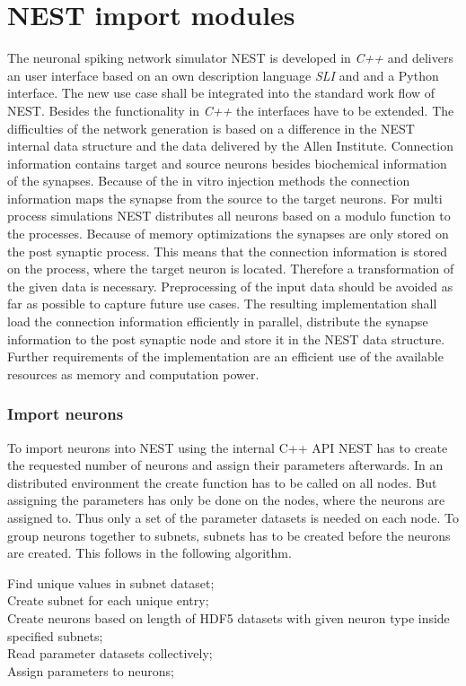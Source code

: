 \section{NEST import modules}
The neuronal spiking network simulator NEST is developed in \emph{C++} and delivers
an user interface based on an own description language \emph{SLI} and  and a Python interface.
The new use case shall be integrated into the standard work flow of NEST.
Besides the functionality in \emph{C++} the interfaces have to be extended.
The difficulties of the network generation is based on a difference in 
the NEST internal data structure and the data delivered by the Allen Institute.
Connection information contains target and source neurons besides biochemical
information of the synapses. Because of the in vitro injection methods the
connection information maps the synapse from the source to the target neurons.
For multi process simulations NEST distributes all neurons based on a modulo function 
to the processes. Because of memory optimizations the synapses are only stored on the
post synaptic process. This means that the connection information is stored
on the process, where the target neuron is located. Therefore a transformation of the given data is
necessary. Preprocessing of the input data should be avoided as far as possible to capture
future use cases.
The resulting implementation shall load the connection information efficiently in parallel,
distribute the synapse information to the post synaptic node and store it in
the NEST data structure.
Further requirements of the implementation are an efficient use of the available resources as
memory and computation power. 


\subsubsection{Import neurons}
To import neurons into NEST using the internal C++ API NEST has to create the requested number of neurons and
assign their parameters afterwards. In an distributed environment the create function has to be called on all nodes. But assigning the parameters has only be done on the nodes, where the neurons are assigned to.
Thus only a set of the parameter datasets is needed on each node.
To group neurons together to subnets, subnets has to be created before the neurons are created.
This follows in the following algorithm.

\begin{algorithm}
 Find unique values in subnet dataset; \\
 Create subnet for each unique entry; \\
 Create neurons based on length of HDF5 datasets with given neuron type inside specified subnets; \\
 Read parameter datasets collectively; \\
 Assign parameters to neurons;
\label{alg2}
\caption{}
\end{algorithm}

